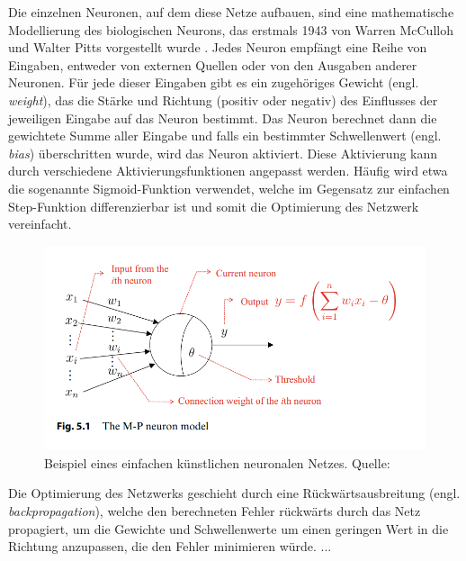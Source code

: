 
Die einzelnen Neuronen, auf dem diese Netze aufbauen, sind eine mathematische Modellierung des biologischen Neurons, das erstmals 1943 von Warren McCulloh und Walter Pitts vorgestellt wurde \parencite{Zhou2021machinelearning}. Jedes Neuron empfängt eine Reihe von Eingaben, entweder von externen Quellen oder von den Ausgaben anderer Neuronen. Für jede dieser Eingaben gibt es ein zugehöriges Gewicht (engl. \textit{weight}), das die Stärke und Richtung (positiv oder negativ) des Einflusses der jeweiligen Eingabe auf das Neuron bestimmt. Das Neuron berechnet dann die gewichtete Summe aller Eingabe und falls ein bestimmter Schwellenwert (engl. \textit{bias}) überschritten wurde, wird das Neuron aktiviert. Diese Aktivierung kann durch verschiedene Aktivierungsfunktionen angepasst werden. Häufig wird etwa die sogenannte Sigmoid-Funktion verwendet, welche im Gegensatz zur einfachen Step-Funktion differenzierbar ist und somit die Optimierung des Netzwerk vereinfacht.

\begin{figure}[] \label{figure-neuron}
	\includegraphics[]{figure_neural_network.png}
	\caption{Beispiel eines einfachen künstlichen neuronalen Netzes. Quelle: \parencite{Zhou2021machinelearning}}
\end{figure}

Die Optimierung des Netzwerks geschieht durch eine Rückwärtsausbreitung (engl. \textit{backpropagation}), welche den berechneten Fehler rückwärts durch das Netz propagiert, um die Gewichte und Schwellenwerte um einen geringen Wert in die Richtung anzupassen, die den Fehler minimieren würde. ...

